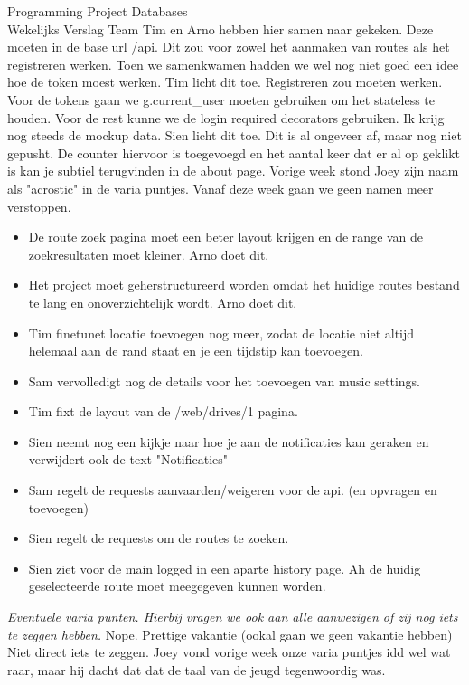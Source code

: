 \documentclass{article}
\newcounter{team}
\begin{document}
\begin{Minutes}{Programming Project Databases \\ Wekelijks Verslag Team }
				    Tim en Arno hebben hier samen naar gekeken. Deze moeten in de base url /api. Dit zou voor zowel het aanmaken van routes als het registreren werken. Toen we samenkwamen hadden we wel nog niet goed een idee hoe de token moest werken. Tim licht dit toe.  Registreren zou moeten werken. Voor de tokens gaan we g.current\_user moeten gebruiken om het stateless te houden. Voor de rest kunne we de login required decorators gebruiken.
				    Ik krijg nog steeds de mockup data. Sien licht dit toe. Dit is al ongeveer af, maar nog niet gepusht.
				    De counter hiervoor is toegevoegd en het aantal keer dat er al op geklikt is kan je subtiel terugvinden in de about page.
				    Vorige week stond Joey zijn naam als "acrostic" in de varia puntjes. Vanaf deze week gaan we geen namen meer verstoppen.

			\begin{itemize}
			    \item De route zoek pagina moet een beter layout krijgen en de range van de zoekresultaten moet kleiner. Arno doet dit.
			    \item Het project moet geherstructureerd worden omdat het huidige routes bestand te lang en onoverzichtelijk wordt. Arno doet dit.
			    \item Tim finetunet locatie toevoegen nog meer, zodat de locatie niet altijd helemaal aan de rand staat en je een tijdstip kan toevoegen.
			    \item Sam vervolledigt nog de details voor het toevoegen van music settings.
			    \item Tim fixt de layout van de /web/drives/1 pagina.
			    \item Sien neemt nog een kijkje naar hoe je aan de notificaties kan geraken en verwijdert ook de text "Notificaties"
			    \item Sam regelt de requests aanvaarden/weigeren voor de api. (en opvragen en toevoegen)
			    \item Sien regelt de requests om de routes te zoeken.
			    \item Sien ziet voor de main logged in een aparte history page. Ah de huidig geselecteerde route moet meegegeven kunnen worden.
			\end{itemize}


			\emph{Eventuele varia punten. Hierbij vragen we ook aan alle aanwezigen of zij nog iets te zeggen hebben.}
				    Nope.
				    Prettige vakantie (ookal gaan we geen vakantie hebben)
				    Niet direct iets te zeggen.
				    Joey vond vorige week onze varia puntjes idd wel wat raar, maar hij dacht dat dat de taal van de jeugd tegenwoordig was.



\end{Minutes}
\end{document}
